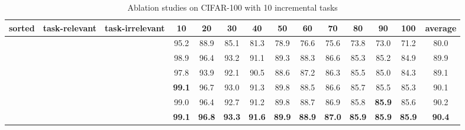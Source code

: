\documentclass[sigconf,anonymous,review,screen]{acmart}
\begin{document}

\begin{table*}[t] \footnotesize
	\centering
	\caption{Ablation studies on CIFAR-100 with 10 incremental tasks}
	\label{tab:13}{
		\begin{tabular}{cccccccccccccc}
			\toprule
			sorted & task-relevant & task-irrelevant & 10 & 20 & 30 & 40 & 50 & 60 & 70 & 80 & 90 & 100 & average \\
			\midrule
			& & & 95.2 & 88.9 & 85.1 & 81.3 & 78.9 & 76.6 & 75.6 & 73.8 & 73.0 & 71.2 & 80.0 \\
			& \checkmark & & 98.9 & 96.4 & 93.2 & 91.1 & 89.3 & 88.3 & 86.6 & 85.3 & 85.2 & 84.9 & 89.9 \\
			& & \checkmark & 97.8 & 93.9 & 92.1 & 90.5 & 88.6 & 87.2 & 86.3 & 85.5 & 85.0 & 84.3 & 89.1 \\
			& \checkmark & \checkmark & \textbf{99.1} & 96.7 & 93.0 & 91.3 & 89.8 & 88.5 & 86.6 & 85.7 & 85.5 & 85.3 & 90.1 \\
			\checkmark & \checkmark & & 99.0 & 96.4 & 92.7 & 91.2 & 89.8 & 88.7 & 86.9 & 85.8 & \textbf{85.9} & 85.6 & 90.2 \\
			\checkmark & \checkmark & \checkmark & \textbf{99.1} & \textbf{96.8} & \textbf{93.3} & \textbf{91.6} & \textbf{89.9} & \textbf{88.9} & \textbf{87.0} & \textbf{85.9} & \textbf{85.9} & \textbf{85.9} & \textbf{90.4} \\
			\bottomrule
	\end{tabular}	}
\end{table*}
\end{document}
